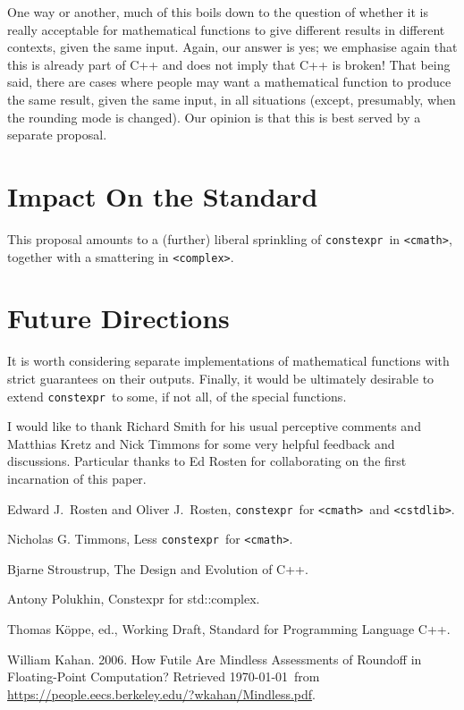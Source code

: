 \documentclass[prd,twocolumn,amsmath,amssymb,nofootinbib,eqsecnum]{revtex4-1}
\newcommand{\constexpr}{\code{constexpr}\xspace}
\newcommand{\code}[1]{{\tt #1}}
\newcommand{\header}[1]{{\tt <#1>}}
\newcommand{\cmath}{\header{cmath}}
\newcommand{\complex}{\header{complex}}
\newcommand{\cstdlib}{\header{cstdlib}}
\begin{document}
One way or another, much of this boils down to the question of whether it is really acceptable for mathematical functions to give different results in different contexts, given the same input. Again, our answer is yes; we emphasise again that this is already part of C++ and does not imply that C++ is broken! That being said, there are cases where people may want a mathematical function to produce the same result, given the same input, in all situations (except, presumably, when the rounding mode is changed). Our opinion is that this is best served by a separate proposal.

\section{Impact On the Standard}

This proposal amounts to a (further) liberal sprinkling of \constexpr\ in \cmath, together with a smattering in \complex.

\section{Future Directions}

It is worth considering separate implementations of mathematical functions with strict guarantees on their outputs. Finally, it would be ultimately desirable to extend \constexpr\ to some, if not all, of the special functions. 


\begin{acknowledgments}
	I would like to thank Richard Smith for his usual perceptive comments and Matthias Kretz and Nick Timmons for some very helpful feedback and discussions. Particular thanks to Ed Rosten for collaborating on the first incarnation of this paper.
\end{acknowledgments}


\begin{thebibliography}{1}
	 Edward J.~Rosten and Oliver J.~Rosten, \constexpr\ for \cmath\ and \cstdlib.

	 Nicholas G. Timmons, Less \constexpr\ for \cmath.
	
	 Bjarne Stroustrup, The Design and Evolution of C++.

	 Antony Polukhin, Constexpr for std::complex.	
		
	 Thomas K\"oppe, ed., Working Draft, Standard for Programming Language C++.	
	
	 William Kahan. 2006. How Futile Are Mindless Assessments of Roundoff in Floating-Point Computation? Retrieved \today\ from \url{https://people.eecs.berkeley.edu/?wkahan/Mindless.pdf}.
	
\end{thebibliography}
\end{document}
